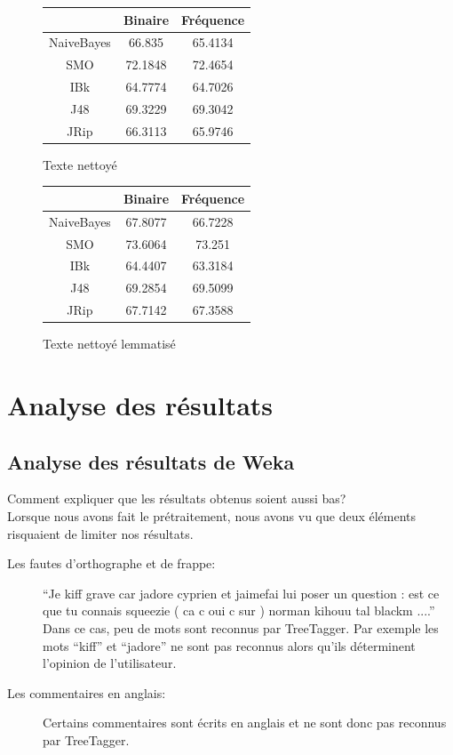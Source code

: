 \documentclass[a4paper, 11pt]{article}
\begin{document}
\begin{figure}[h]
\begin{minipage}{0.5\textwidth}
\begin{tabular}{|c|c|c|}
\hline
 & Binaire & Fréquence \\
 \hline
 NaiveBayes & 66.835 & 65.4134 \\
 \hline
 SMO & 72.1848 & 72.4654 \\
 \hline
 IBk & 64.7774 & 64.7026 \\
 \hline
 J48 & 69.3229 & 69.3042 \\
 \hline
 JRip & 66.3113 & 65.9746 \\
 \hline
\end{tabular}
\caption{Texte nettoyé}
\end{minipage}
\begin{minipage}{0.5\textwidth}
\begin{tabular}{|c|c|c|}
\hline
 & Binaire & Fréquence \\
 \hline
 NaiveBayes & 67.8077 & 66.7228 \\
 \hline
 SMO & 73.6064 & 73.251 \\
 \hline
 IBk & 64.4407 & 63.3184 \\
 \hline
 J48 & 69.2854 & 69.5099 \\
 \hline
 JRip & 67.7142 & 67.3588 \\
 \hline
\end{tabular}
\caption{Texte nettoyé lemmatisé}
\end{minipage}
\end{figure}


\section{Analyse des résultats}

\subsection{Analyse des résultats de Weka}
Comment expliquer que les résultats obtenus soient aussi bas?\\

Lorsque nous avons fait le prétraitement, nous avons vu que deux éléments risquaient de limiter nos résultats.

\begin{description}
	\item [Les fautes d'orthographe et de frappe: ]``Je kiff grave car jadore cyprien et jaimefai lui poser un question : est ce que tu connais squeezie ( ca c oui c sur ) norman kihouu tal blackm ....''\\
	
	Dans ce cas, peu de mots sont reconnus par TreeTagger. Par exemple les mots ``kiff'' et ``jadore'' ne sont pas reconnus alors qu'ils déterminent l'opinion de l'utilisateur.
	
	\item [Les commentaires en anglais: ]Certains commentaires sont écrits en anglais et ne sont donc pas reconnus par TreeTagger.
\end{description}
\end{document}
